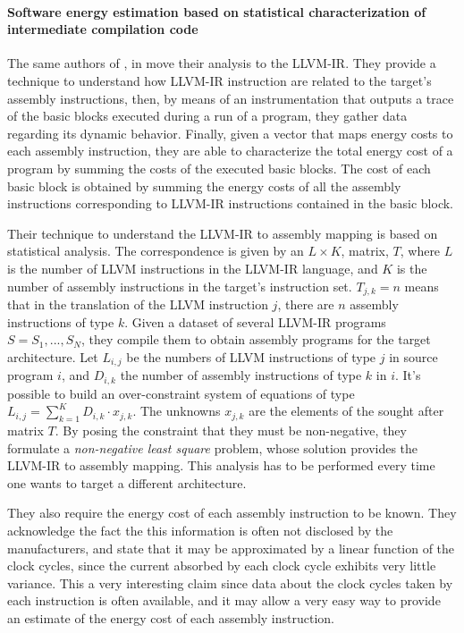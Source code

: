 \paragraph{Software energy estimation based on statistical characterization of intermediate compilation code}
The same authors of \cite{brando2008}, in \cite{brando2011} move their analysis to the LLVM-IR. They provide a technique to understand how LLVM-IR instruction are related to the target's assembly instructions, then, by means of an instrumentation that outputs a trace of the basic blocks executed during a run of a program, they gather data regarding its dynamic behavior. Finally, given a vector that maps energy costs to each assembly instruction, they are able to characterize the total energy cost of a program by summing the costs of the executed basic blocks. The cost of each basic block is obtained by summing the energy costs of all the assembly instructions corresponding to LLVM-IR instructions contained in the basic block. \par 
Their technique to understand the LLVM-IR to assembly mapping is based on statistical analysis. The correspondence is given by an $L \times K$, matrix, $T$, where $L$ is the number of LLVM instructions in the LLVM-IR language, and $K$ is the number of assembly instructions in the target's instruction set. $T_{j,k} = n$ means that in the translation of the LLVM instruction $j$, there are $n$ assembly instructions of type $k$. \newline Given a dataset of several LLVM-IR programs $S = {S_{1},...,S_{N}}$, they compile them to obtain assembly programs for the target architecture. Let $L_{i,j}$ be the numbers of LLVM instructions of type $j$ in source program $i$, and $D_{i,k}$ the number of assembly instructions of type $k$ in $i$. It's possible to build an over-constraint system of equations of type $L_{i,j} = \sum_{k=1}^{K} D_{i,k} \cdot x_{j,k}$. The unknowns $x_{j,k}$ are the elements of the sought after matrix $T$. By posing the constraint that they must be non-negative, they formulate a \emph{non-negative least square} problem, whose solution provides the LLVM-IR to assembly mapping. This analysis has to be performed every time one wants to target a different architecture. \par 
They also require the energy cost of each assembly instruction to be known. They acknowledge the fact the this information is often not disclosed by the manufacturers, and state that it may be approximated by a linear function of the clock cycles, since the  current absorbed by each clock cycle exhibits very little variance. This a very interesting claim since data about the clock cycles taken by each instruction is often available, and it may allow a very easy way to provide an estimate of the energy cost of each assembly instruction. 

